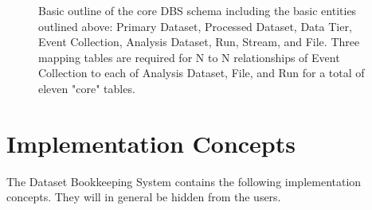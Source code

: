 \documentclass{cmspaper}
\begin{document}
\begin{figure}[hbtp]
  \begin{center}
    \caption{Basic outline of the core DBS schema including the basic entities outlined 
above: Primary Dataset, Processed Dataset, Data Tier, Event Collection, Analysis Dataset, Run, 
Stream, and File.  Three mapping tables are required for N to N relationships of 
Event Collection to each of Analysis Dataset, File, and Run for a total of eleven "core" tables. }
    \label{fig:highlevel}
  \end{center}
\end{figure}

\section{Implementation Concepts}

The Dataset Bookkeeping System contains the following implementation concepts. 
They will in general be hidden from the users.  
\end{document}
